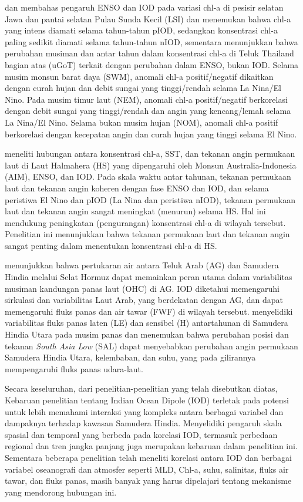\begin{spacing}{1.5}
	 dan  membahas pengaruh ENSO dan IOD pada variasi chl-a di pesisir selatan Jawa dan pantai selatan Pulau Sunda Kecil (LSI) dan menemukan bahwa chl-a yang intens diamati selama tahun-tahun pIOD, sedangkan konsentrasi chl-a paling sedikit diamati selama tahun-tahun nIOD, sementara  menunjukkan bahwa perubahan musiman dan antar tahun dalam konsentrasi chl-a di Teluk Thailand bagian atas (uGoT) terkait dengan perubahan dalam ENSO, bukan IOD. Selama musim monsun barat daya (SWM), anomali chl-a positif/negatif dikaitkan dengan curah hujan dan debit sungai yang tinggi/rendah selama La Nina/El Nino. Pada musim timur laut (NEM), anomali chl-a positif/negatif berkorelasi dengan debit sungai yang tinggi/rendah dan angin yang kencang/lemah selama La Nina/El Nino. Selama bukan musim hujan (NOM), anomali chl-a positif berkorelasi dengan kecepatan angin dan curah hujan yang tinggi selama El Nino. 
	
	 meneliti hubungan antara konsentrasi chl-a, SST, dan tekanan angin permukaan laut di Laut Halmahera (HS) yang dipengaruhi oleh Monsun Australia-Indonesia (AIM), ENSO, dan IOD. Pada skala waktu antar tahunan, tekanan permukaan laut dan tekanan angin koheren dengan fase ENSO dan IOD, dan selama peristiwa El Nino dan pIOD (La Nina dan peristiwa nIOD), tekanan permukaan laut dan tekanan angin sangat meningkat (menurun) selama HS. Hal ini mendukung peningkatan (pengurangan) konsentrasi chl-a di wilayah tersebut. Penelitian ini menunjukkan bahwa tekanan permukaan laut dan tekanan angin sangat penting dalam menentukan konsentrasi chl-a di HS.
	
	 menunjukkan bahwa pertukaran air antara Teluk Arab (AG) dan Samudera Hindia melalui Selat Hormuz dapat memainkan peran utama dalam variabilitas musiman kandungan panas laut (OHC) di AG. IOD diketahui memengaruhi sirkulasi dan variabilitas Laut Arab, yang berdekatan dengan AG, dan dapat memengaruhi fluks panas dan air tawar (FWF) di wilayah tersebut.   menyelidiki variabilitas fluks panas laten (LE) dan sensibel (H) antartahunan di Samudera Hindia Utara pada musim panas dan menemukan bahwa perubahan posisi dan tekanan \textit{South Asia Low} (SAL) dapat menyebabkan perubahan angin permukaan Samudera Hindia Utara, kelembaban, dan suhu, yang pada gilirannya mempengaruhi fluks panas udara-laut.
	
	Secara keseluruhan, dari penelitian-penelitian yang telah disebutkan diatas, Kebaruan penelitian tentang Indian Ocean Dipole (IOD) terletak pada potensi untuk lebih memahami interaksi yang kompleks antara berbagai variabel dan dampaknya terhadap kawasan Samudera Hindia. Menyelidiki pengaruh skala spasial dan temporal yang berbeda pada korelasi IOD, termasuk perbedaan regional dan tren jangka panjang juga merupakan kebaruan dalam penelitian ini. Sementara beberapa penelitian telah meneliti korelasi antara IOD dan berbagai variabel oseanografi dan atmosfer seperti MLD, Chl-a, suhu, salinitas, fluks air tawar, dan fluks panas, masih banyak yang harus dipelajari tentang mekanisme yang mendorong hubungan ini.
	
\end{spacing}
\vspace{-1pc}
